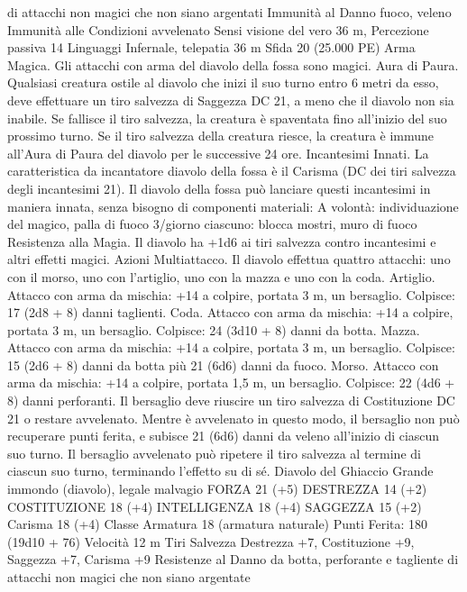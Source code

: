 \begin{multicols}{2}
di attacchi non magici che non siano argentati
Immunità al Danno fuoco, veleno
Immunità alle Condizioni avvelenato
Sensi visione del vero 36 m, Percezione passiva 14
Linguaggi Infernale, telepatia 36 m
Sfida 20 (25.000 PE)
Arma Magica. Gli attacchi con arma del diavolo della fossa sono
magici.
Aura di Paura. Qualsiasi creatura ostile al diavolo che inizi il
suo turno entro 6 metri da esso, deve effettuare un tiro salvezza
di Saggezza DC 21, a meno che il diavolo non sia inabile. Se
fallisce il tiro salvezza, la creatura è spaventata fino all’inizio del
suo prossimo turno. Se il tiro salvezza della creatura riesce, la
creatura è immune all’Aura di Paura del diavolo per le
successive 24 ore.
Incantesimi Innati. La caratteristica da incantatore diavolo della
fossa è il Carisma (DC dei tiri salvezza degli incantesimi 21). Il
diavolo della fossa può lanciare questi incantesimi in maniera
innata, senza bisogno di componenti materiali:
A volontà: individuazione del magico, palla di fuoco
3/giorno ciascuno: blocca mostri, muro di fuoco
Resistenza alla Magia. Il diavolo ha +1d6 ai tiri salvezza
contro incantesimi e altri effetti magici.
Azioni
Multiattacco. Il diavolo effettua quattro attacchi: uno con il
morso, uno con l’artiglio, uno con la mazza e uno con la coda.
Artiglio. Attacco con arma da mischia: +14 a colpire, portata 3
m, un bersaglio.
Colpisce: 17 (2d8 + 8) danni taglienti.
Coda. Attacco con arma da mischia: +14 a colpire, portata 3 m,
un bersaglio.
Colpisce: 24 (3d10 + 8) danni da botta.
Mazza. Attacco con arma da mischia: +14 a colpire, portata 3 m,
un bersaglio.
Colpisce: 15 (2d6 + 8) danni da botta più 21 (6d6) danni da
fuoco.
Morso. Attacco con arma da mischia: +14 a colpire, portata 1,5
m, un bersaglio.
Colpisce: 22 (4d6 + 8) danni perforanti. Il bersaglio deve riuscire
un tiro salvezza di Costituzione DC 21 o restare avvelenato.
Mentre è avvelenato in questo modo, il bersaglio non può
recuperare punti ferita, e subisce 21 (6d6) danni da veleno
all’inizio di ciascun suo turno. Il bersaglio avvelenato può
ripetere il tiro salvezza al termine di ciascun suo turno,
terminando l’effetto su di sé.
Diavolo del Ghiaccio
Grande immondo (diavolo), legale malvagio
FORZA 21 (+5)
DESTREZZA 14 (+2)
COSTITUZIONE 18 (+4)
INTELLIGENZA 18 (+4)
SAGGEZZA 15 (+2)
Carisma 18 (+4)
Classe Armatura 18 (armatura naturale)
\hspace*{0pt}\hfill{Punti Ferita}: 180 (19d10 + 76)
Velocità 12 m
Tiri Salvezza Destrezza +7, Costituzione +9, Saggezza +7,
Carisma +9
Resistenze al Danno da botta, perforante e tagliente di
attacchi non magici che non siano argentate

\end{multicols}
